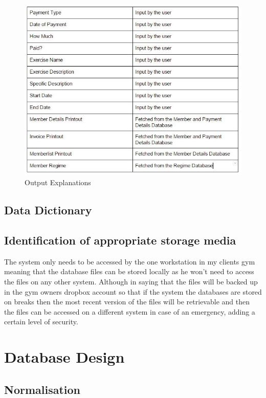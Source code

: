 \begin{itemize}
\begin{figure}[H]
    \includegraphics[width=\textwidth]{Outputexplanations2.JPG}
    \caption{Output Explanations} \label{fig:Output Explanations}
\end{figure}

\subsection{Data Dictionary}

\subsection{Identification of appropriate storage media}

The system only needs to be accessed by the one workstation in my clients gym meaning that the database files can be stored locally as he won't need to access the files on any other system. Although in saying that the files will be backed up in the gym owners dropbox account so that if the system the databases are stored on breaks then the most recent version of the files will be retrievable and then the files can be accessed on a different system in case of an emergency, adding a certain level of security. 

\section{Database Design}

\subsection{Normalisation}


\end{itemize}
